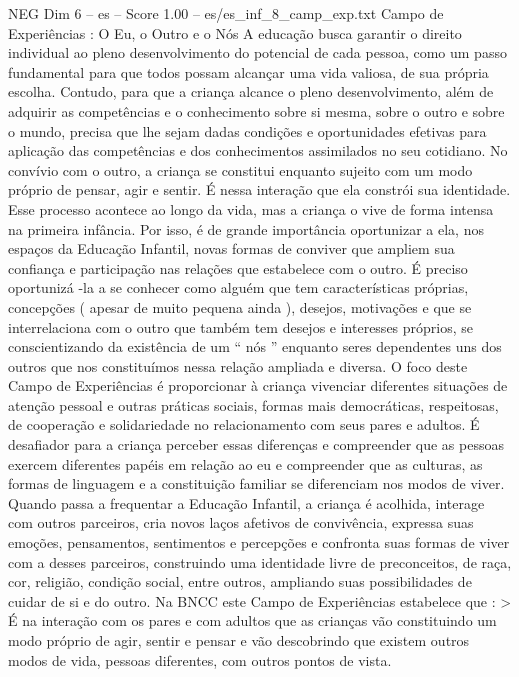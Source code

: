 \begin{textsample}{NEG Dim 6 – es – Score 1.00 – es/es\_inf\_8\_camp\_exp.txt}  \label{ex:f6_neg_150}
Campo de Experiências : O Eu, o Outro e o Nós A educação busca garantir o direito individual ao pleno desenvolvimento do potencial de cada pessoa, como um passo fundamental para que todos possam alcançar uma vida valiosa, de sua própria escolha.
Contudo, para que a criança alcance o pleno desenvolvimento, além de adquirir as competências e o conhecimento sobre si mesma, sobre o outro e sobre o mundo, precisa que lhe sejam dadas condições e oportunidades efetivas para aplicação das competências e dos conhecimentos assimilados no seu cotidiano.
No convívio com o outro, a criança se constitui enquanto sujeito com um modo próprio de pensar, agir e sentir.
É nessa interação que ela constrói sua identidade.
Esse processo acontece ao longo da vida, mas a criança o vive de forma intensa na primeira infância.
Por isso, é de grande importância oportunizar a ela, nos espaços da Educação Infantil, novas formas de conviver que ampliem sua confiança e participação nas relações que estabelece com o outro.
É preciso oportunizá -la a se conhecer como alguém que tem características próprias, concepções ( apesar de muito pequena ainda ), desejos, motivações e que se interrelaciona com o outro que também tem desejos e interesses próprios, se conscientizando da existência de um “ nós ” enquanto seres dependentes uns dos outros que nos constituímos nessa relação ampliada e diversa.
O foco deste Campo de Experiências é proporcionar à criança vivenciar diferentes situações de atenção pessoal e outras práticas sociais, formas mais democráticas, respeitosas, de cooperação e solidariedade no relacionamento com seus pares e adultos.
É desafiador para a criança perceber essas diferenças e compreender que as pessoas exercem diferentes papéis em relação ao eu e compreender que as culturas, as formas de linguagem e a constituição familiar se diferenciam nos modos de viver.
Quando passa a frequentar a Educação Infantil, a criança é acolhida, interage com outros parceiros, cria novos laços afetivos de convivência, expressa suas emoções, pensamentos, sentimentos e percepções e confronta suas formas de viver com a desses parceiros, construindo uma identidade livre de preconceitos, de raça, cor, religião, condição social, entre outros, ampliando suas possibilidades de cuidar de si e do outro.
Na BNCC este Campo de Experiências estabelece que : > É na interação com os pares e com adultos que as crianças vão constituindo um modo próprio de agir, sentir e pensar e vão descobrindo que existem outros modos de vida, pessoas diferentes, com outros pontos de vista.

\end{textsample}
